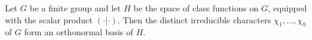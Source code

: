Let $G$ be a finite group and let $H$ be the space of class functions on $G$, equipped with the scalar product $(\cdot|\cdot)$. Then the distinct irreducible characters $\chi_1, \ldots, \chi_h$ of $G$ form an orthonormal basis of $H$.